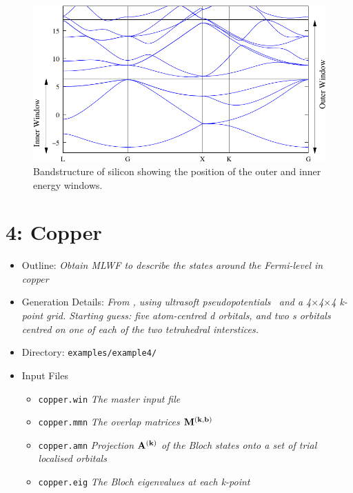 \documentclass[a4paper,11pt,twoside]{article}
\begin{document}
\begin{figure}[h]
\begin{center}
\includegraphics{si}
\caption{Bandstructure of silicon showing the position of the outer
  and inner energy windows.} 
\label{fig:si.bnd}
\end{center}
\end{figure}

\cleardoublepage


\section*{4: Copper}

\begin{itemize}
\item{Outline: \it{Obtain MLWF to describe the states around the
    Fermi-level in copper}} 
\item{Generation Details: \it{From \pwscf, using ultrasoft
    pseudopotentials~\cite{USPP} and a
    4$\times$4$\times$4 k-point grid. Starting guess: five 
    atom-centred d orbitals, and two s orbitals centred on one of each
    of the two tetrahedral interstices.}}
\item{Directory: {\tt examples/example4/}}
\item{Input Files}
\begin{itemize}
\item{ {\tt copper.win}  {\it The master input file}}
\item{ {\tt copper.mmn}  {\it The overlap matrices $\mathbf{M}^{(\mathbf{k},\mathbf{b})}$}}
\item{ {\tt copper.amn}  {\it Projection $\mathbf{A}^{(\mathbf{k})}$ of the Bloch states onto a
    set of trial localised orbitals}} 
\item{ {\tt copper.eig}  {\it The Bloch eigenvalues at each k-point}}
\end{itemize}

\end{itemize}
\end{document}
